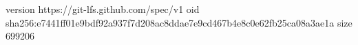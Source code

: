 version https://git-lfs.github.com/spec/v1
oid sha256:e7441ff01e9bdf92a937f7d208ac8ddae7e9cd467b4e8c0e62fb25ca08a3ae1a
size 699206
